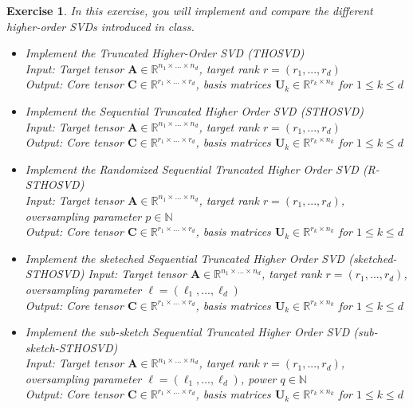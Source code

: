 \documentclass[11pt]{article}
\newcommand{\bvec}[1]{\mathbf{#1}}
\newcommand{\vA}{\bvec{A}}
\newcommand{\vC}{\bvec{C}}
\newcommand{\vU}{\bvec{U}}
\newtheorem{exercise}[theorem]{Exercise}
\begin{document}
\begin{exercise}
In this exercise, you will implement and compare the different higher-order SVDs introduced in class.
\begin{itemize}
    \item[i)] Implement the {\it Truncated Higher-Order SVD} (THOSVD)\\
    Input: Target tensor $\vA\in\mathbb{R}^{n_1\times ... \times n_d}$, target rank $r = (r_1,...,r_d)$\\
    Output: Core tensor $\vC\in\mathbb{R}^{r_1\times ... \times r_d}$, basis matrices $\vU_k\in \mathbb{R}^{r_k\times n_k}$ for $1\leq k \leq d$
    \item[ii)] Implement the {\it Sequential Truncated Higher Order SVD} (STHOSVD)\\
    Input: Target tensor $\vA\in\mathbb{R}^{n_1\times ... \times n_d}$, target rank $r = (r_1,...,r_d)$\\
    Output: Core tensor $\vC\in\mathbb{R}^{r_1\times ... \times r_d}$, basis matrices $\vU_k\in \mathbb{R}^{r_k\times n_k}$ for $1\leq k \leq d$
     \item[iii)] Implement the {\it Randomized Sequential Truncated Higher Order SVD} (R-STHOSVD)\\
     Input: Target tensor $\vA\in\mathbb{R}^{n_1\times ... \times n_d}$, target rank $r = (r_1,...,r_d)$, oversampling parameter $p\in\mathbb{N}$\\
    Output: Core tensor $\vC\in\mathbb{R}^{r_1\times ... \times r_d}$, basis matrices $\vU_k\in \mathbb{R}^{r_k\times n_k}$ for $1\leq k \leq d$
    \item[iv)] Implement the {\it sketeched Sequential Truncated Higher Order SVD} (sketched-STHOSVD)
    Input: Target tensor $\vA\in\mathbb{R}^{n_1\times ... \times n_d}$, target rank $r = (r_1,...,r_d)$, oversampling parameter $\ell = (\ell_1,...,\ell_d)$\\
    Output: Core tensor $\vC\in\mathbb{R}^{r_1\times ... \times r_d}$, basis matrices $\vU_k\in \mathbb{R}^{r_k\times n_k}$ for $1\leq k \leq d$
      \item[v)] Implement the {\it sub-sketch Sequential Truncated Higher Order SVD} (sub-sketch-STHOSVD)\\
      Input: Target tensor $\vA\in\mathbb{R}^{n_1\times ... \times n_d}$, target rank $r = (r_1,...,r_d)$, oversampling parameter $\ell = (\ell_1,...,\ell_d)$, power $q\in\mathbb{N}$\\
    Output: Core tensor $\vC\in\mathbb{R}^{r_1\times ... \times r_d}$, basis matrices $\vU_k\in \mathbb{R}^{r_k\times n_k}$ for $1\leq k \leq d$

\end{itemize}
\end{exercise}
\end{document}
